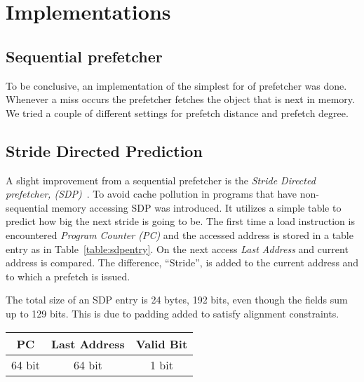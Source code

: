 \section{Implementations}


\subsection{Sequential prefetcher}
To be conclusive, an implementation of the simplest for of prefetcher
was done. Whenever a miss occurs the prefetcher fetches the object
that is next in memory. We tried a couple of different settings for
prefetch distance and prefetch degree.

\subsection{Stride Directed Prediction}
A slight improvement from a sequential prefetcher is the
\textit{Stride Directed prefetcher, (SDP)}~\cite{sdp}.
To avoid cache pollution in programs that have non-sequential memory
accessing SDP was introduced. It utilizes a simple table to
predict how big the next stride is going to be. The first time a load
instruction is encountered \textit{Program Counter (PC)} and the
accessed address is stored in a table entry as in
Table~\ref{table:sdpentry}. On the next access \textit{Last Address}
and current address is compared. The difference, ``Stride'', is added
to the current address and to which a prefetch is issued.

The total size of an SDP entry is 24 bytes, 192 bits, even though the
fields sum up to 129 bits. This is due to padding added to satisfy
alignment constraints.

\begin{center}
  \begin{tabular}{ | c | c | c |}
    \hline
    PC & Last Address & Valid Bit \\ \hline
    64 bit & 64 bit & 1 bit \\ \hline
  \end{tabular}
  \label{table:sdpentry}
\end{center}


